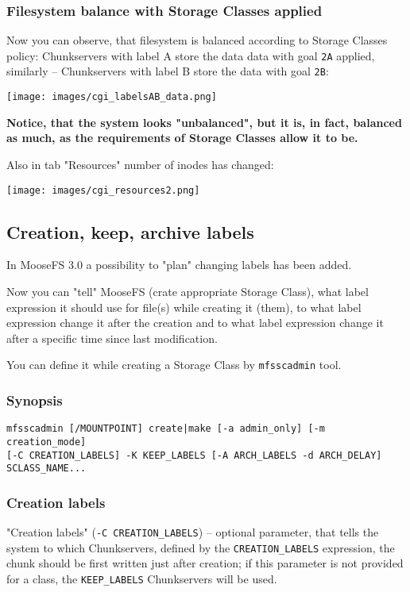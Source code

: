 \documentclass[a4paper,11pt,english]{report}
\def\code#1{\texttt{#1}}
\begin{document}
				\subsubsection{Filesystem balance with Storage Classes applied}
				Now you can observe, that filesystem is balanced according to Storage Classes policy: Chunkservers with label A store the data data with goal \code{2A} applied, similarly -- Chunkservers with label B store the data with goal \code{2B}:
				
				\texttt{[image: images/cgi\_labelsAB\_data.png]}
				
				\textbf{Notice, that the system looks "unbalanced", but it is, in fact, balanced as much, as the requirements of Storage Classes allow it to be.}
				
				Also in tab "Resources" number of inodes has changed:
				
				\texttt{[image: images/cgi\_resources2.png]}
			
			\subsection{Creation, keep, archive labels}
			In MooseFS 3.0 a possibility to "plan" changing labels has been added.
			
			Now you can "tell" MooseFS (crate appropriate Storage Class), what label expression it should use for file(s) while creating it (them), to what label expression change it after the creation and to what label expression change it after a specific time since last modification.
			
			You can define it while creating a Storage Class by \code{mfsscadmin} tool.
			
				\subsubsection{Synopsis}
				\code{mfsscadmin [/MOUNTPOINT] create|make [-a admin\_only] [-m creation\_mode]} \\ \code{[-C CREATION\_LABELS] -K KEEP\_LABELS [-A ARCH\_LABELS -d ARCH\_DELAY] SCLASS\_NAME...}
			
				\subsubsection{Creation labels}
				"Creation labels" (\code{-C CREATION\_LABELS}) -- optional parameter, that tells the system to which Chunkservers, defined by the \code{CREATION\_LABELS} expression, the chunk should be first written just after creation; if this parameter is not provided for a class, the \code{KEEP\_LABELS} Chunkservers will be used.
			
\end{document}
